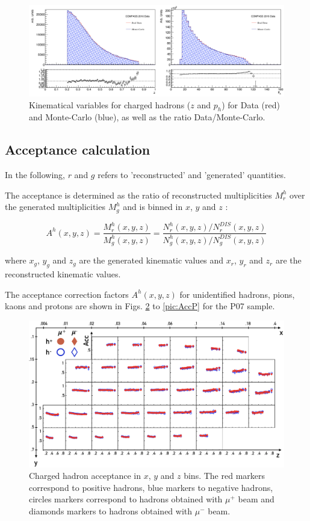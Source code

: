 \begin{figure}[!h]
	\includegraphics[scale=0.45]{./gfx/SIDIS_kin.png}
	\caption{Kinematical variables for charged hadrons ($z$ and $p_h$) for Data (red) and Monte-Carlo (blue), as well as the ratio Data/Monte-Carlo.}
	\label{pic:MCSIDISkin}
\end{figure}

\subsection{Acceptance calculation}

In the following, $r$ and $g$ refers to 'reconstructed' and 'generated' quantities.

The acceptance is determined as the ratio of reconstructed multiplicities $M^h_r$ over the generated multiplicities $M^h_g$ and is binned in $x$, $y$ and $z$ :

\begin{equation}
  A^h(x,y,z) = \frac{M^h_r(x,y,z)}{M^h_g(x,y,z)}=\frac{N^h_r(x,y,z)/N^{DIS}_r(x,y,z)}{N^h_g(x,y,z)/N^{DIS}_g(x,y,z)}
\end{equation}

where $x_g$, $y_g$ and $z_g$ are the generated kinematic values and $x_r$, $y_r$ and $z_r$ are the reconstructed kinematic values.

The acceptance correction factors $A^h(x,y,z)$ for unidentified hadrons, pions, kaons and protons are shown in Figs. \ref{pic:AccH} to \ref{pic:AccP} for the P07 sample.

\begin{figure}
	\includegraphics[scale=0.6]{./gfx/AccH.png}
	\caption{Charged hadron acceptance in $x$, $y$ and $z$ bins. The red markers correspond to positive hadrons, blue markers to negative hadrons, circles markers correspond to hadrons obtained with $\mu^+$ beam and diamonds markers to hadrons obtained with $\mu^-$ beam.}
	\label{pic:AccH}
\end{figure}

